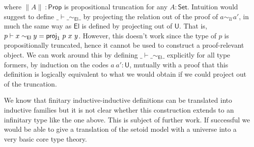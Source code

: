 \documentclass{easychair}
\newcommand{\setoidU}{\mathcal{U}}
\newcommand{\ad}[1]{\AgdaFunction{#1}}
\newcommand{\Set}{\textsf{Set}}
\newcommand{\Prop}{\textsf{Prop}}
\newcommand{\U}{\textsf{U}}
\newcommand{\El}{\textsf{El}}
\begin{document}
where $\parallel A \parallel\ : \Prop$ is propositional truncation for any $A :
\Set$. Intuition would suggest to define $\_\vdash\_\sim_{\El}\_$ by projecting
the relation out of the proof of $a \sim_{\setoidU} a'$, in much the same way as
$\El$ is defined by projecting out of $\U$. That is, $p \vdash x \sim_{\El} y =
\ad{proj}_1\ p\ x\ y$.
%
However, this doesn't work since the type of $p$ is propositionally truncated,
hence it cannot be used to construct a proof-relevant object. We can work around
this by defining $\_\vdash\_\sim_{\El}\_$ explicitly for all type formers, by
induction on the codes $a\ a' : \U$, mutually with a proof that this definition
is logically equivalent to what we would obtain if we could project out of the
truncation.

We know that finitary inductive-inductive definitions can be translated into
inductive families \cite{iit-erasure,iit-to-ix,induction-is-enough} but it is
not clear whether this construction extends to an infinitary type like the one
above. This is subject of further work. If successful we would be able to give a
translation of the setoid model with a universe into a very basic core type
theory.



\end{document}
